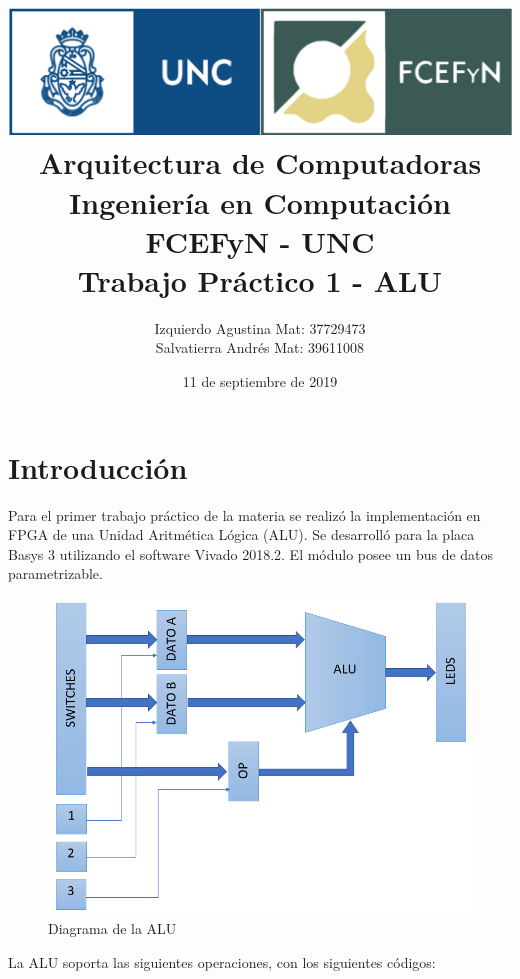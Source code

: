 \documentclass[a4paper]{article}
\begin{document}
\title{%
\includegraphics[scale = 0.5]{./header_unc.png}\\[1.0 cm]	%
  Arquitectura de Computadoras \\
  \large Ingeniería en Computación FCEFyN - UNC\\
  		Trabajo Práctico 1 - ALU
  }


  \author{Izquierdo Agustina Mat: 37729473\\
          Salvatierra Andrés Mat: 39611008}
  
  \date{11 de septiembre de 2019}
\maketitle

\section{Introducción}

Para el primer trabajo práctico de la materia se realizó la implementación en FPGA de una Unidad Aritmética Lógica (ALU). Se desarrolló para la placa Basys 3 utilizando el software Vivado 2018.2. El módulo posee un bus de datos parametrizable. 

\begin{figure}[!htb]
\centering
\includegraphics[width=.6\textwidth]{alu.jpg}
\caption{\label{fig:alu}Diagrama de la ALU}
\end{figure}

\newpage

La ALU soporta las siguientes operaciones, con los siguientes códigos:\\
\end{document}
